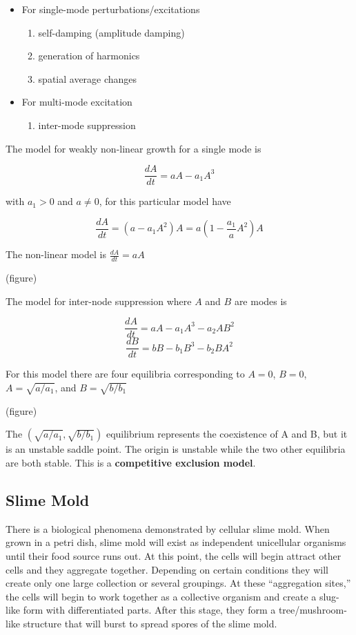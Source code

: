 \documentclass[]{article}
\numberwithin{equation}{section}		%
\begin{document}
\begin{itemize}
\item For single-mode perturbations/excitations
\begin{enumerate}
\item self-damping (amplitude damping)
\item generation of harmonics
\item spatial average changes
\end{enumerate}
\item For multi-mode excitation
\begin{enumerate}
\item inter-mode suppression
\end{enumerate}
\end{itemize}

The model for weakly non-linear growth for a single mode is

$$\frac{dA}{dt}=aA-a_1A^3$$

with $a_1>0$ and $a\neq 0$, for this particular model have

$$\frac{dA}{dt}=(a-a_1A^2)A=a\left(1-\frac{a_1}{a}A^2\right)A$$

The non-linear model is $\frac{dA}{dt}=aA$

(figure)

The model for inter-node suppression where $A$ and $B$ are modes is

$$\frac{dA}{dt}=aA-a_1A^3-a_2AB^2$$
$$\frac{dB}{dt}=bB-b_1B^3-b_2BA^2$$

For this model there are four equilibria corresponding to $A=0$, $B=0$, $A=\sqrt{a/a_1}$, and $B=\sqrt{b/b_1}$

(figure)

The $(\sqrt{a/a_1},\sqrt{b/b_1})$ equilibrium represents the coexistence of A and B, but it is an unstable saddle point.  The origin is unstable while the two other equilibria are both stable.  This is a \textbf{competitive exclusion model}.

\subsection{Slime Mold}

There is a biological phenomena demonstrated by cellular slime mold.  When grown in a petri dish, slime mold will exist as independent unicellular organisms until their food source runs out. At this point, the cells will begin attract other cells and they aggregate together. Depending on certain conditions they will create only one large collection or several groupings. At these ``aggregation sites,'' the cells will begin to work together as a collective organism and create a slug-like form with differentiated parts. After this stage, they form a tree/mushroom-like structure that will burst to spread spores of the slime mold.
\end{document}
